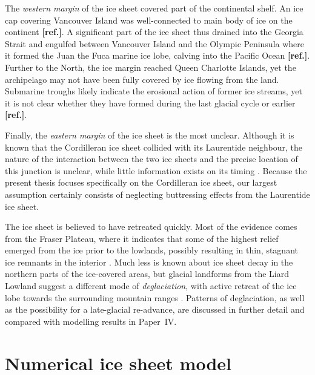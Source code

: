 \documentclass{article}
\newcommand{\mref}[0]{\textbf{[ref.]}}
\newcommand{\CCYC}[0]{Paper~IV}     %
\begin{document}
The \emph{western margin} of the ice sheet covered part of the continental
shelf. An
ice cap covering Vancouver Island was well-connected to main body of ice on the
continent \mref. A significant part of the ice sheet thus drained into the Georgia
Strait and engulfed between Vancouver Island and the Olympic Peninsula where
it formed the Juan the Fuca marine ice lobe, calving into the Pacific Ocean \mref.
Further to the North, the ice margin reached Queen Charlotte Islands, yet the
archipelago may not have been fully covered by ice
flowing from the land. Submarine troughs likely indicate the erosional action of
former ice streams, yet it is not clear whether they have formed during the
last glacial cycle or earlier \mref.

Finally, the \emph{eastern margin} of the ice sheet is the most unclear.
Although it
is known that the Cordilleran ice sheet collided with its Laurentide neighbour,
the nature of the interaction between the two ice sheets and the precise
location of this junction is unclear, while little information exists on its
timing
    \citep[e.g.][]{Jackson.etal.1997, Bednarski.Smith.2007}.
Because the
present thesis focuses specifically on the Cordilleran ice sheet, our largest
assumption certainly consists of neglecting buttressing effects from the
Laurentide ice sheet.

The ice sheet is believed to have retreated quickly. Most of the evidence comes
from the Fraser Plateau, where it indicates that some of the highest relief
emerged from the ice prior to the lowlands, possibly resulting in thin,
stagnant ice remnants in the interior
    \citep{Fulton.1967, Fulton.1991, Margold.etal.2011, Margold.etal.2013a}.
Much less is known about ice sheet decay in the northern parts of the
ice-covered areas, but glacial landforms from the Liard Lowland suggest a
different mode of \emph{deglaciation}, with active retreat of the ice lobe
towards the surrounding mountain ranges \citep{Margold.etal.2013}. Patterns of
deglaciation, as well as the possibility for a late-glacial re-advance, are
discussed in further detail and compared with modelling results in \CCYC.

\section{Numerical ice sheet model}

\end{document}
